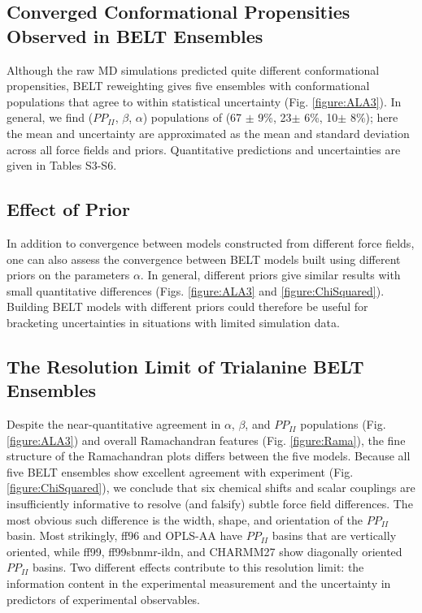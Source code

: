 \documentclass[11pt,titlepage]{article}
\begin{document}
\subsection*{Converged Conformational Propensities Observed in BELT Ensembles}

Although the raw MD simulations predicted quite different conformational propensities, BELT reweighting gives five ensembles with conformational populations that agree to within statistical uncertainty (Fig. \ref{figure:ALA3}).  In general, we find ($PP_{II}$, $\beta$, $\alpha$) populations of (67 $\pm$ 9\%, 23$\pm$ 6\%, 10$\pm$ 8\%); here the mean and uncertainty are approximated as the mean and standard deviation across all force fields and priors.  Quantitative predictions and uncertainties are given in Tables S3-S6.  

\subsection*{Effect of Prior}

In addition to convergence between models constructed from different force fields, one can also assess the convergence between BELT models built using different priors on the parameters $\alpha$.  In general, different priors give similar results with small quantitative differences (Figs. \ref{figure:ALA3} and \ref{figure:ChiSquared}).  Building BELT models with different priors could therefore be useful for bracketing uncertainties in situations with limited simulation data.  

\subsection*{The Resolution Limit of Trialanine BELT Ensembles}

Despite the near-quantitative agreement in $\alpha$, $\beta$, and $PP_{II}$ populations (Fig. \ref{figure:ALA3}) and overall Ramachandran features (Fig. \ref{figure:Rama}), the fine structure of the Ramachandran plots differs between the five models.  Because all five BELT ensembles show excellent agreement with experiment (Fig. \ref{figure:ChiSquared}), we conclude that six chemical shifts and scalar couplings are insufficiently informative to resolve (and falsify) subtle force field differences.  The most obvious such difference is the width, shape, and orientation of the $PP_{II}$ basin.  Most strikingly, ff96 and OPLS-AA have $PP_{II}$ basins that are vertically oriented, while ff99, ff99sbnmr-ildn, and CHARMM27 show diagonally oriented $PP_{II}$ basins.  Two different effects contribute to this resolution limit: the information content in the experimental measurement and the uncertainty in predictors of experimental observables.
\end{document}
